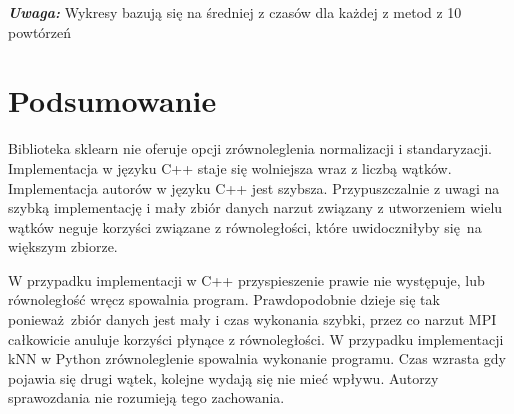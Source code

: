 \documentclass{scrartcl}
\begin{document}
\textbf{\textit{Uwaga:}} Wykresy bazują się na średniej z czasów dla każdej z metod z 10 powtórzeń









\section{Podsumowanie}

Biblioteka sklearn nie oferuje opcji zrównoleglenia normalizacji i standaryzacji. Implementacja w języku C++ staje się wolniejsza wraz z liczbą wątków. Implementacja autorów w języku C++ jest szybsza. Przypuszczalnie z uwagi na szybką implementację i mały zbiór danych narzut związany z utworzeniem wielu wątków neguje korzyści związane z równoległości, które uwidoczniłyby się na większym zbiorze.

W przypadku implementacji w C++ przyspieszenie prawie nie występuje, lub równoległość wręcz spowalnia program. Prawdopodobnie dzieje się tak ponieważ zbiór danych jest mały i czas wykonania szybki, przez co narzut MPI całkowicie anuluje korzyści płynące z równoległości.
W przypadku implementacji kNN w Python zrównoleglenie spowalnia wykonanie programu. Czas wzrasta gdy pojawia się drugi wątek, kolejne wydają się nie mieć wpływu. Autorzy sprawozdania nie rozumieją tego zachowania.







\end{document}
